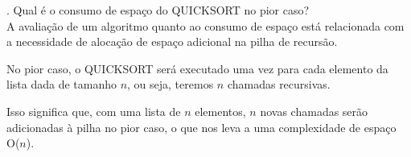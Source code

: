 . Qual é o consumo de espaço do QUICKSORT no pior caso?\\[6pt]
A avaliação de um algoritmo quanto ao consumo de espaço está relacionada com a necessidade de alocação de espaço adicional na pilha de recursão.

No pior caso, o QUICKSORT será executado uma vez para cada elemento da lista dada de tamanho $n$, ou seja, teremos $n$ chamadas recursivas.

Isso significa que, com uma lista de $n$ elementos, $n$ novas chamadas serão adicionadas à pilha no pior caso, o que nos leva a uma complexidade de espaço O($n$).